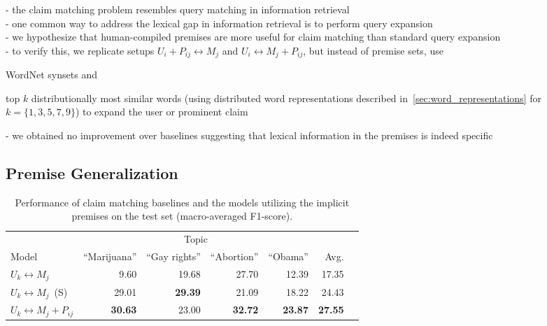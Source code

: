 \noindent - the claim matching problem resembles query matching in information retrieval \\
- one common way to address the lexical gap in information retrieval is to perform
query expansion \citep{voorhees1994query} \\
- we hypothesize that human-compiled premises are more useful for claim matching than standard
query expansion \\
- to verify this, we replicate setups $U_i + P_{ij} \leftrightarrow M_j$ and
$U_i \leftrightarrow M_j + P_{ij}$, but instead of premise sets, use
\begin{enumerate*}[label=(\arabic*)]
\item WordNet \citep{miller1995wordnet} synsets and
\item top $k$ distributionally most similar words (using distributed
word representations described in~\ref{sec:word_representations} for $k=\{1, 3, 5, 7, 9\}$) to
expand the user or prominent claim 
\end{enumerate*}
- we obtained no improvement over baselines suggesting that lexical information 
in the premises is indeed specific \\

\subsection{Premise Generalization}

\begin{table}[t]
\begin{center}
{\small
\setlength{\tabcolsep}{5.9pt}
\begin{tabular}{lrrrrrr}
\toprule
&\multicolumn{4}{c}{Topic}\\
\cmidrule(lr){2-5}
Model & ``Marijuana'' & ``Gay rights''  & ``Abortion'' & ``Obama'' & Avg. \\
\midrule
$U_k \leftrightarrow M_j$   & 9.60          & 19.68        & 27.70        & 12.39        & 17.35 \\
$U_k \leftrightarrow M_j$\ (S)   & 29.01         & {\bf 29.39}  & 21.09        & 18.22        & 24.43 \\
$U_k \leftrightarrow M_j + P_{ij}$  & {\bf 30.63}   & 23.00        & {\bf 32.72}  & {\bf 23.87}  & {\bf 27.55} \\
\bottomrule
\end{tabular}}
\caption{Performance of claim matching baselines and the models utilizing the
implicit premises on the test set (macro-averaged F1-score).}
\label{tab:argpremise_generalization}
\end{center}
\end{table}

